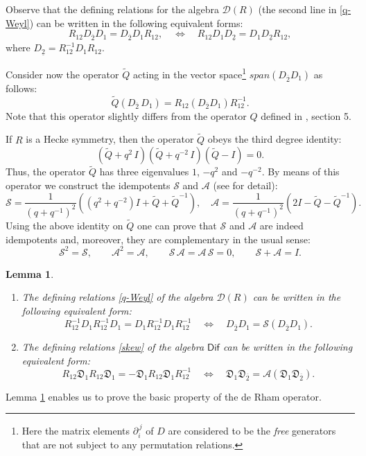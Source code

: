 \documentclass[11pt]{article}
\newcommand{\un}{\underline}
\newcommand{\ov}{\overline}
\newcommand{\DD}{\mathcal{D}}
\newcommand{\DDDD}{\mathfrak{D}}
\newcommand{\AAA}{\mathcal{A}}
\newcommand{\SSS}{\mathcal{S}}
\newcommand{\tQ}{\widetilde Q}
\newcommand{\Dif}{\mathsf{Dif}}
\numberwithin{equation}{section}
\theoremstyle{plain}
\newtheorem{lemma}[theorem]{Lemma}
\theoremstyle{definition}
\begin{document}
Observe that the defining relations for the algebra $\DD(R)$ (the second line in \eqref{q-Weyl}) can be written in the following equivalent
forms:
\[
R_{12} D_{\ov 2} D_1=D_{\ov 2} D_1 R_{12}, \quad \Leftrightarrow \quad R_{12} D_{1} D_{\un 2}=D_{1} D_{\un 2} R_{12},
\]
where $D_{\un 2}=R_{12}^{-1} D_1R_{12}$.

Consider now the operator $\tQ$ acting in the vector space\footnote{Here the matrix elements $\partial_i^{\,j}$ of $D$ are considered
to be the \emph{free} generators that are not subject to any permutation relations.} $span(D_{\ov 2}D_1)$ as follows:
\[
\tQ(D_{\ov 2}\, D_1)=R_{12}(D_{\ov 2} D_1) R_{12}^{-1}.
\]
Note that this operator slightly differs from the operator $Q$ defined in \cite{GPS1}, section 5.

If $R$ is a Hecke symmetry, then the operator $\tQ$ obeys the third degree identity:
\[
(\tQ+q^2\, I)(\tQ+q^{-2}\, I)(\tQ-I)=0.
\]
Thus, the operator $\tQ$ has three eigenvalues $1$, $-q^2$ and $-q^{-2}$. By means of this operator we
construct the idempotents $\SSS$ and $\AAA$ (see \cite{GPS1} for detail):
\[
\mathcal{S} = \frac{1}{(q+q^{-1})^2}\left( (q^2+q^{-2})I +\tQ+\tQ^{-1}\right), \quad
\mathcal{A} = \frac{1}{(q+q^{-1})^2}\left( 2I - \tQ - \tQ^{-1}\right).
\]
Using the above identity on $\tQ$ one can prove that $\mathcal{S}$ and $\mathcal{A}$ are indeed idempotents and, moreover, they
are complementary in the usual sense:
\[
\mathcal{S}^2 = \mathcal{S},\qquad \mathcal{A}^2 = \mathcal{A}, \qquad
{\SSS\, \AAA=\AAA\,\SSS}=0,\qquad {\SSS+\AAA}=I.
\]

\begin{lemma}\label{lem:8}
	
\begin{enumerate}
\item The defining relations \eqref{q-Weyl} of the algebra $\DD(R)$ can be written in the following equivalent form:
\[
R_{12}^{-1} D_1 R_{12}^{-1}  D_1 = D_1 R_{12}^{-1} D_1 R_{12}^{-1}\quad \Leftrightarrow\quad
D_{\ov 2} D_1= {\SSS}(D_{\ov 2} D_1).
\]
\item
The defining relations \eqref{skew} of the algebra $\Dif$ can be written in the following equivalent form:
\[
R_{12}\DDDD_1R_{12} \DDDD_{1}=-\DDDD_1R_{12} \DDDD_{1} R_{12}^{-1} \quad \Leftrightarrow\quad
\DDDD_1 \DDDD_{\ov 2}={\AAA}(\DDDD_1 \DDDD_{\ov 2}).
\]
\end{enumerate}
\end{lemma}

Lemma \ref{lem:8} enables us  to prove the basic property of the de Rham operator.
\end{document}
